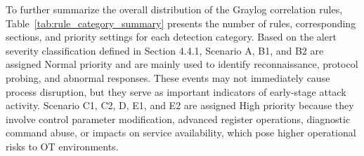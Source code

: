 \newpage
To further summarize the overall distribution of the Graylog correlation rules, Table~\ref{tab:rule_category_summary} presents the number of rules, corresponding sections, and priority settings for each detection category. Based on the alert severity classification defined in Section 4.4.1, Scenario A, B1, and B2 are assigned Normal priority and are mainly used to identify reconnaissance, protocol probing, and abnormal responses. These events may not immediately cause process disruption, but they serve as important indicators of early-stage attack activity. Scenario C1, C2, D, E1, and E2 are assigned High priority because they involve control parameter modification, advanced register operations, diagnostic command abuse, or impacts on service availability, which pose higher operational risks to OT environments.
\begin{table}[htbp]
\caption{Summary of Detection Rule Categories and Corresponding Priorities}
\centering
\footnotesize
\renewcommand{\arraystretch}{1.5}

\label{tab:rule_category_summary}
\end{table}

